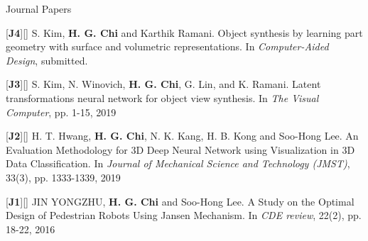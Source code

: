 


\begin{cventries}

\cvpub
{Journal Papers} %
{ %
\begin{cvitems}
\item {[\textbf{J4}][\href{https://docs.google.com/viewer?url=https://github.com/stnoah1/CV/raw/master/documents/CAD.pdf}{}] S. Kim, \textbf{H. G. Chi} and Karthik Ramani. Object synthesis by learning part geometry with surface and volumetric representations. In \textit{Computer-Aided Design}, submitted.}
\item {[\textbf{J3}][\href{https://link.springer.com/article/10.1007/s00371-019-01755-x}{}] S. Kim, N. Winovich, \textbf{H. G. Chi}, G. Lin, and K. Ramani. Latent transformations neural network for object view synthesis. In \textit{The Visual Computer}, pp. 1-15, 2019}
\item {[\textbf{J2}][\href{https://link.springer.com/content/pdf/10.1007/s12206-019-0233-1.pdf}{}] H. T. Hwang, \textbf{H. G. Chi}, N. K. Kang, H. B. Kong and Soo-Hong Lee. An Evaluation Methodology for 3D Deep Neural Network using Visualization in 3D Data Classification. In \textit{Journal of Mechanical Science and Technology (JMST)}, 33(3), pp. 1333-1339, 2019}
\item {[\textbf{J1}][\href{https://docs.google.com/viewer?url=https://github.com/stnoah1/CV/raw/master/documents/Edison.pdf}{}] JIN YONGZHU, \textbf{H. G. Chi} and Soo-Hong Lee. A Study on the Optimal Design of Pedestrian Robots Using Jansen Mechanism. In \textit{CDE review}, 22(2), pp. 18-22, 2016}
\end{cvitems}
}


\end{cventries}
